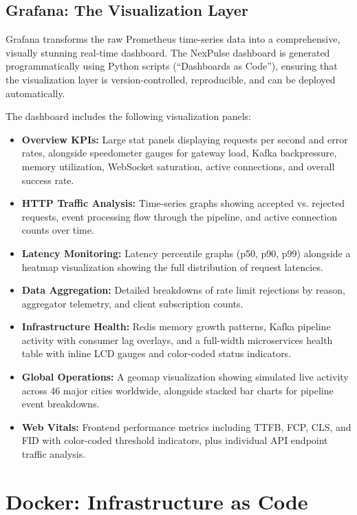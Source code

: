 \documentclass[12pt,a4paper]{article}
\begin{document}
\subsection{Grafana: The Visualization Layer}

Grafana transforms the raw Prometheus time-series data into a comprehensive, visually stunning real-time dashboard. The NexPulse dashboard is generated programmatically using Python scripts (``Dashboards as Code''), ensuring that the visualization layer is version-controlled, reproducible, and can be deployed automatically.

The dashboard includes the following visualization panels:

\begin{itemize}[leftmargin=2em]
    \item \textbf{Overview KPIs:} Large stat panels displaying requests per second and error rates, alongside speedometer gauges for gateway load, Kafka backpressure, memory utilization, WebSocket saturation, active connections, and overall success rate.
    \item \textbf{HTTP Traffic Analysis:} Time-series graphs showing accepted vs. rejected requests, event processing flow through the pipeline, and active connection counts over time.
    \item \textbf{Latency Monitoring:} Latency percentile graphs (p50, p90, p99) alongside a heatmap visualization showing the full distribution of request latencies.
    \item \textbf{Data Aggregation:} Detailed breakdowns of rate limit rejections by reason, aggregator telemetry, and client subscription counts.
    \item \textbf{Infrastructure Health:} Redis memory growth patterns, Kafka pipeline activity with consumer lag overlays, and a full-width microservices health table with inline LCD gauges and color-coded status indicators.
    \item \textbf{Global Operations:} A geomap visualization showing simulated live activity across 46 major cities worldwide, alongside stacked bar charts for pipeline event breakdowns.
    \item \textbf{Web Vitals:} Frontend performance metrics including TTFB, FCP, CLS, and FID with color-coded threshold indicators, plus individual API endpoint traffic analysis.
\end{itemize}

\section{Docker: Infrastructure as Code}
\end{document}
